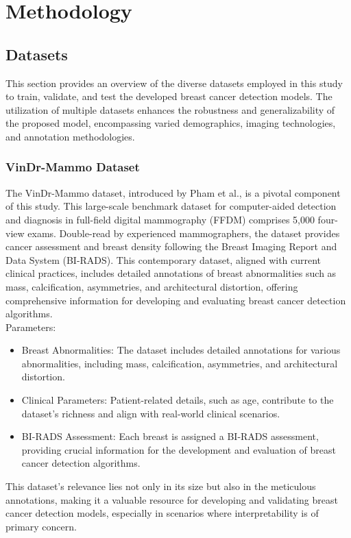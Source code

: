 \chapter{Methodology}
\label{chap3}
\section{Datasets}
This section provides an overview of the diverse datasets employed in this study to train, validate, and test the developed breast cancer detection models. The utilization of multiple datasets enhances the robustness and generalizability of the proposed model, encompassing varied demographics, imaging technologies, and annotation methodologies.
\subsection{VinDr-Mammo Dataset}
The VinDr-Mammo dataset, introduced by Pham et al.\cite{Vindir}, is a pivotal component of this study. This large-scale benchmark dataset for computer-aided detection and diagnosis in full-field digital mammography (FFDM) comprises 5,000 four-view exams. Double-read by experienced mammographers, the dataset provides cancer assessment and breast density following the Breast Imaging Report and Data System (BI-RADS). This contemporary dataset, aligned with current clinical practices, includes detailed annotations of breast abnormalities such as mass, calcification, asymmetries, and architectural distortion, offering comprehensive information for developing and evaluating breast cancer detection algorithms.
\\ Parameters:
\begin{itemize}
  \item Breast Abnormalities: The dataset includes detailed annotations for various abnormalities, including mass, calcification, asymmetries, and architectural distortion.
  \item Clinical Parameters: Patient-related details, such as age, contribute to the dataset's richness and align with real-world clinical scenarios.
  \item BI-RADS Assessment: Each breast is assigned a BI-RADS assessment, providing crucial information for the development and evaluation of breast cancer detection algorithms.
\end{itemize}
This dataset's relevance lies not only in its size but also in the meticulous annotations, making it a valuable resource for developing and validating breast cancer detection models, especially in scenarios where interpretability is of primary concern.
